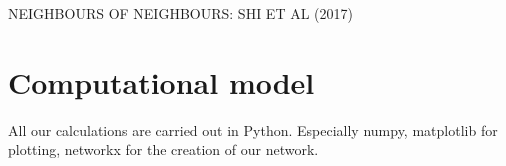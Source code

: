 \documentclass[11pt]{article}
\begin{document}
NEIGHBOURS OF NEIGHBOURS: SHI ET AL (2017)


\section{Computational model}
All our calculations are carried out in Python. Especially numpy, matplotlib for plotting, networkx for the creation of our network. 
\end{document}
